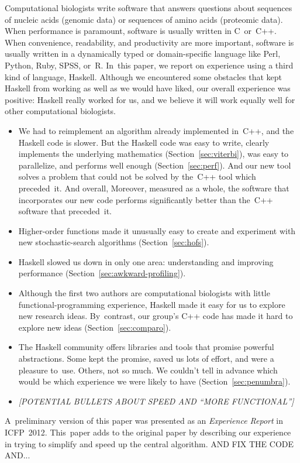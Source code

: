 \documentclass[]{jfp1}
\newcommand\secref[1]{Section~\ref{sec:#1}}
\begin{document}
Computational biologists write software that answers questions about 
sequences of nucleic acids (genomic data) or sequences of amino 
acids (proteomic data). 
When performance is paramount,
software is usually written in C~or~C++. 
When convenience, readability, and
productivity are more important,
software is usually written in a dynamically typed
or domain-specific language like
Perl, Python, Ruby, SPSS, or~R.
In~this paper, we report on experience using a third kind of language,
Haskell.
Although we encountered some obstacles that kept Haskell from working
as well as we would have liked, our overall experience was positive:
Haskell really worked for us, and we believe it will work equally well
for other computational biologists.
\begin{itemize}
\item
We had to reimplement an
algorithm already implemented in~C++, 
and the Haskell code is slower.
But the Haskell code was easy to write,     %
clearly implements the underlying mathematics
 (\secref{viterbi}),
 was easy to parallelize,
and performs well enough
(\secref{perf}).
\ifpagetuning
  And our new tool solves a problem that could not be solved by
  the~C++ tool which preceded~it.
\else
  \ifpagetuning
  And overall,
  \else
  Moreover, measured as a whole, 
  \fi
  the software that incorporates our new
  code 
  performs significantly
  better than the~C++ software that preceded~it.
\fi
\item
Higher-order functions made it unusually easy to
create and experiment with new stochastic-search algorithms
(\secref{hofs}).
\item
Haskell slowed us down in only one area:  understanding and
improving
performance (\secref{awkward-profiling}).
\item
Although the first two authors are computational
biologists
with little functional-programming experience,
Haskell made it easy for us to explore new research ideas.
By~contrast,
our group's C++ code has 
made it hard to explore
new ideas
(\secref{comparo}).
\item
The Haskell community offers libraries and tools that
promise powerful abstractions.
Some kept the promise, saved us lots of effort, and were a pleasure
to~use.
Others, not so much.
We couldn't tell in advance which 
\ifpagetuning
would be which
\else
experience we were likely to have
\fi
 (\secref{penumbra}).
\item
\emph{[POTENTIAL BULLETS ABOUT SPEED AND ``MORE FUNCTIONAL'']}
\end{itemize}
A~preliminary version of this
paper \citep{daniels:haskell-in-bio:2012} was presented as 
an \emph{Experience Report} in ICFP~2012.
This~paper adds to the original paper by describing our experience in
trying to simplify and speed up the central algorithm.
AND FIX THE CODE AND...
\end{document}
